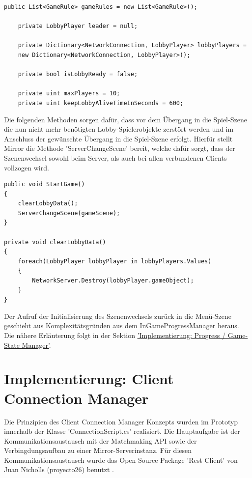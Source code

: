 \newpage

\begin{lstlisting}[caption= GameNetworkManager.cs Lobby Variables]
	public List<GameRule> gameRules = new List<GameRule>();
	
	private LobbyPlayer leader = null;
	
	private Dictionary<NetworkConnection, LobbyPlayer> lobbyPlayers = 
	new Dictionary<NetworkConnection, LobbyPlayer>();
	
	private bool isLobbyReady = false;
	
	private uint maxPlayers = 10;
	private uint keepLobbyAliveTimeInSeconds = 600;
\end{lstlisting}

Die folgenden Methoden sorgen dafür, dass vor dem Übergang in die Spiel-Szene die nun nicht mehr benötigten Lobby-Spielerobjekte zerstört werden und im Anschluss der gewünschte Übergang in die Spiel-Szene erfolgt. Hierfür stellt Mirror die Methode 'ServerChangeScene' bereit, welche dafür sorgt, dass der Szenenwechsel sowohl beim Server, als auch bei allen verbundenen Clients vollzogen wird.

\begin{lstlisting}[caption= GameNetworkManager.cs StartGame]
public void StartGame()
{
	clearLobbyData();
	ServerChangeScene(gameScene);
}

private void clearLobbyData()
{
	foreach(LobbyPlayer lobbyPlayer in lobbyPlayers.Values)
	{
		NetworkServer.Destroy(lobbyPlayer.gameObject);
	}
}
\end{lstlisting}

Der Aufruf der Initialisierung des Szenenwechsels zurück in die Menü-Szene geschieht aus Komplexitätsgründen aus dem InGameProgressManager heraus. Die nähere Erläuterung folgt in der Sektion \hyperref[Progress Manager]{'Implementierung: Progress / Game-State Manager'}.

\section{Implementierung: Client Connection Manager}

Die Prinzipien des Client Connection Manager Konzepts wurden im Prototyp innerhalb der Klasse 'ConnectionScript.cs' realisiert. Die Hauptaufgabe ist der Kommunikationsaustausch mit der Matchmaking API sowie der Verbingdungsaufbau zu einer Mirror-Serverinstanz. Für diesen Kommunikationsaustausch wurde das Open Source Package 'Rest Client' von Juan Nicholls (proyecto26) benutzt \cite{GitHub.10.02.2022}.

